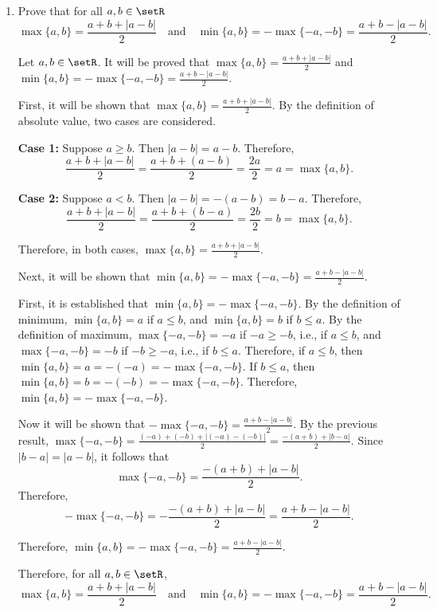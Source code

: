 \begin{enumerate}
  \item Prove that for all \(a,b\in\setR\)
  \[
    \max\{a,b\}=\frac{a+b+|a-b|}{2}
    \quad\text{and}\quad
    \min\{a,b\}=-\max\{-a,-b\}=\frac{a+b-|a-b|}{2}.
  \]
  \begin{subprove}
    Let \(a, b \in \setR\).
    It will be proved that \(\max\{a,b\} = \frac{a+b+|a-b|}{2}\) and 
    \(\min\{a,b\} = -\max\{-a,-b\} = \frac{a+b-|a-b|}{2}\).
    
    First, it will be shown that \(\max\{a,b\} = \frac{a+b+|a-b|}{2}\).
    By the definition of absolute value, two cases are considered.
    
    \textbf{Case 1:} Suppose \(a \ge b\).
    Then \(|a-b| = a-b\).
    Therefore,
    \[
      \frac{a+b+|a-b|}{2} = \frac{a+b+(a-b)}{2} = \frac{2a}{2} = a = \max\{a,b\}.
    \]
    
    \textbf{Case 2:} Suppose \(a < b\).
    Then \(|a-b| = -(a-b) = b-a\).
    Therefore,
    \[
      \frac{a+b+|a-b|}{2} = \frac{a+b+(b-a)}{2} = \frac{2b}{2} = b = \max\{a,b\}.
    \]
    
    Therefore, in both cases, \(\max\{a,b\} = \frac{a+b+|a-b|}{2}\).
    
    Next, it will be shown that \(\min\{a,b\} = -\max\{-a,-b\} = \frac{a+b-|a-b|}{2}\).
    
    First, it is established that \(\min\{a,b\} = -\max\{-a,-b\}\).
    By the definition of minimum, \(\min\{a,b\} = a\) if \(a \le b\), and \(\min\{a,b\} = b\) if \(b \le a\).
    By the definition of maximum, \(\max\{-a,-b\} = -a\) if \(-a \ge -b\), i.e., if \(a \le b\),
    and \(\max\{-a,-b\} = -b\) if \(-b \ge -a\), i.e., if \(b \le a\).
    Therefore, if \(a \le b\), then \(\min\{a,b\} = a = -(-a) = -\max\{-a,-b\}\).
    If \(b \le a\), then \(\min\{a,b\} = b = -(-b) = -\max\{-a,-b\}\).
    Therefore, \(\min\{a,b\} = -\max\{-a,-b\}\).
    
    Now it will be shown that \(-\max\{-a,-b\} = \frac{a+b-|a-b|}{2}\).
    By the previous result, \(\max\{-a,-b\} = \frac{(-a)+(-b)+|(-a)-(-b)|}{2} = \frac{-(a+b)+|b-a|}{2}\).
    Since \(|b-a| = |a-b|\), it follows that
    \[
      \max\{-a,-b\} = \frac{-(a+b)+|a-b|}{2}.
    \]
    Therefore,
    \[
      -\max\{-a,-b\} = -\frac{-(a+b)+|a-b|}{2} = \frac{a+b-|a-b|}{2}.
    \]
    
    Therefore, \(\min\{a,b\} = -\max\{-a,-b\} = \frac{a+b-|a-b|}{2}\).
    
    Therefore, for all \(a,b \in \setR\),
    \[
      \max\{a,b\} = \frac{a+b+|a-b|}{2} \quad\text{and}\quad
      \min\{a,b\} = -\max\{-a,-b\} = \frac{a+b-|a-b|}{2}.
    \]
  \end{subprove}


\end{enumerate}
